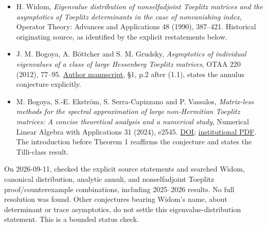 \documentclass[11pt,a4paper]{article}
\providecommand{\tightlist}{\setlength{\itemsep}{0pt}\setlength{\parskip}{0pt}}
\begin{document}
\begin{itemize}
\tightlist
\item
  H. Widom, \emph{Eigenvalue distribution of nonselfadjoint Toeplitz
  matrices and the asymptotics of Toeplitz determinants in the case of
  nonvanishing index}, Operator Theory: Advances and Applications 48
  (1990), 387--421. Historical originating source, as identified by the
  explicit restatements below.
\item
  J. M. Bogoya, A. Böttcher and S. M. Grudsky, \emph{Asymptotics of
  individual eigenvalues of a class of large Hessenberg Toeplitz
  matrices}, OTAA 220 (2012), 77--95.
  \href{https://www.math.cinvestav.mx/~grudsky/Papers/116.pdf}{Author
  manuscript}, §1, p.2 after (1.1), states the annulus conjecture
  explicitly.
\item
  M. Bogoya, S.-E. Ekström, S. Serra-Capizzano and P. Vassalos,
  \emph{Matrix-less methods for the spectral approximation of large
  non-Hermitian Toeplitz matrices: A concise theoretical analysis and a
  numerical study}, Numerical Linear Algebra with Applications 31
  (2024), e2545. \href{https://doi.org/10.1002/nla.2545}{DOI};
  \href{https://uu.diva-portal.org/smash/get/diva2\%3A1824576/FULLTEXT01.pdf}{institutional
  PDF}. The introduction before Theorem 1 reaffirms the conjecture and
  states the Tilli-class result.
\end{itemize}

On 2026-09-11, checked the explicit source statements and searched
Widom, canonical distribution, analytic annuli, and nonselfadjoint
Toeplitz proof/counterexample combinations, including 2025--2026
results. No full resolution was found. Other conjectures bearing Widom's
name, about determinant or trace asymptotics, do not settle this
eigenvalue-distribution statement. This is a bounded status check.
\end{document}
